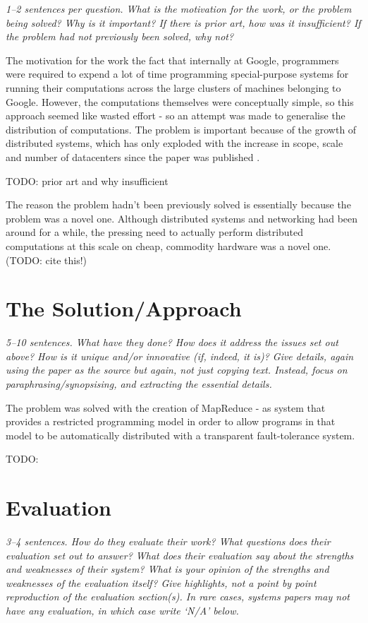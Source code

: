 \documentclass[11pt]{article}
\begin{document}
\textsl{1--2 sentences per question. What is the motivation for the work, or
the problem being solved? Why is it important? If there is prior art, how was
it insufficient? If the problem had not previously been solved, why not?}

The motivation for the work the fact that internally at Google, programmers
were required to expend a lot of time programming special-purpose systems for
running their computations across the large clusters of machines belonging to
Google. However, the computations themselves were conceptually simple, so this
approach seemed like wasted effort - so an attempt was made to generalise the
distribution of computations. The problem is important because of the growth of
distributed systems, which has only exploded with the increase in scope, scale
and number of datacenters since the paper was published
\cite{VirtualizationGrowth}.

TODO: prior art and why insufficient

The reason the problem hadn't been previously solved is essentially because the
problem was a novel one. Although distributed systems and networking had been
around for a while, the pressing need to actually perform distributed
computations at this scale on cheap, commodity hardware was a novel one. (TODO:
cite this!)

\section*{The Solution/Approach}

\textsl{5--10 sentences. What have they done? How does it address the issues
set out above? How is it unique and/or innovative (if, indeed, it is)? Give
details, again using the paper as the source but again, not just copying text.
Instead, focus on paraphrasing/synopsising, and extracting the essential
details.}

The problem was solved with the creation of MapReduce - as system that provides
a restricted programming model in order to allow programs in that model to be
automatically distributed with a transparent fault-tolerance system.

TODO:

\section*{Evaluation}

\textsl{3--4 sentences. How do they evaluate their work? What questions does
their evaluation set out to answer? What does their evaluation say about the
strengths and weaknesses of their system? What is your opinion of the strengths
and weaknesses of the evaluation itself? Give highlights, not a point by point
reproduction of the evaluation section(s). In rare cases, systems papers may
not have any evaluation, in which case write `N/A' below.}
\end{document}
